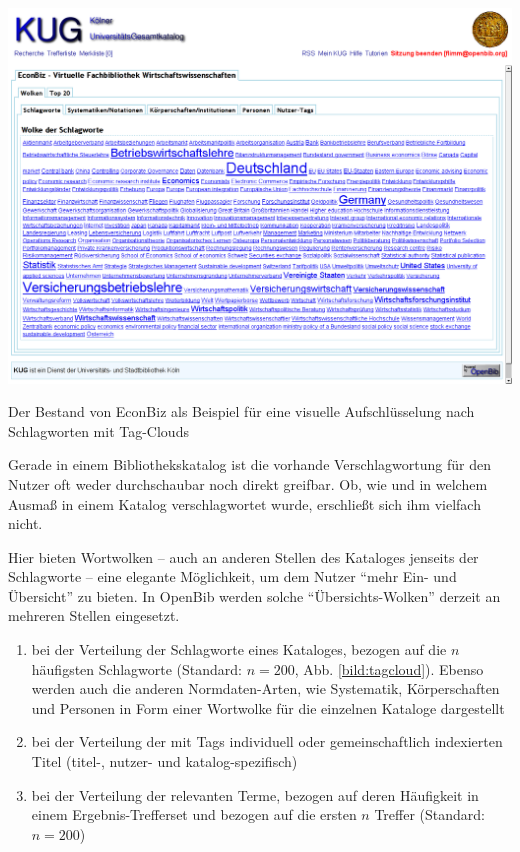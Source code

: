 \documentclass[11pt]{scrartcl}
\begin{document}
\begin{shadowenv}
  \vspace{4mm}
    \centering \begin{minipage}[b]{1.0\textwidth}
      \centering \includegraphics[width=15cm]{openbib-bfp-2007_bilder/Abb-05-schlagwortwolke.png}
    \end{minipage}
    \caption{Der Bestand von EconBiz als Beispiel für eine visuelle Aufschlüsselung nach Schlagworten mit Tag-Clouds}
  \label{bild:tagcloud}
  \vspace{3mm}
\end{shadowenv}


Gerade in einem Bibliothekskatalog ist die vorhande Verschlagwortung
für den Nutzer oft weder durchschaubar noch direkt greifbar. Ob, wie
und in welchem Ausmaß in einem Katalog verschlagwortet wurde,
erschließt sich ihm vielfach nicht.

Hier bieten Wortwolken -- auch an anderen Stellen des Kataloges
jenseits der Schlagworte -- eine elegante Möglichkeit, um dem Nutzer
"`mehr Ein- und Übersicht"' zu bieten. In OpenBib werden solche
"`Übersichts-Wolken"' derzeit an mehreren Stellen eingesetzt.
\begin{enumerate}
\item bei der Verteilung der Schlagworte eines Kataloges, bezogen auf
  die $n$ häufigsten Schlagworte (Standard: $n=200$, Abb. \ref{bild:tagcloud}). Ebenso
  werden auch die anderen Normdaten-Arten, wie Systematik,
  Körperschaften und Personen in Form einer Wortwolke für die
  einzelnen Kataloge dargestellt
\item bei der Verteilung der mit Tags individuell oder
  gemeinschaftlich indexierten Titel (titel-, nutzer- und
  katalog-spezifisch)
\item bei der Verteilung der relevanten Terme, bezogen auf deren
  Häufigkeit in einem Ergebnis-Trefferset und bezogen auf die ersten $n$
  Treffer (Standard: $n=200$)
\end{enumerate}
\end{document}
